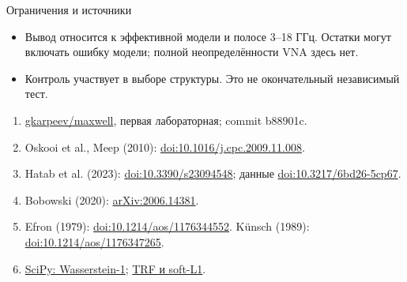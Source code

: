 \documentclass{beamer}
\begin{document}
\begin{frame}{Ограничения и источники}\footnotesize
\begin{itemize}
\item Вывод относится к эффективной модели и полосе 3--18 ГГц.
Остатки могут включать ошибку модели; полной неопределённости VNA здесь нет.
\item Контроль участвует в выборе структуры. Это не окончательный независимый тест.
\end{itemize}
\medskip
\begin{enumerate}
\item \href{https://github.com/gkarpeev/maxwell}{gkarpeev/maxwell}, первая лабораторная; commit b88901c.
\item Oskooi et al., Meep (2010): \href{https://doi.org/10.1016/j.cpc.2009.11.008}{doi:10.1016/j.cpc.2009.11.008}.
\item Hatab et al. (2023): \href{https://doi.org/10.3390/s23094548}{doi:10.3390/s23094548};
данные \href{https://doi.org/10.3217/6bd26-5cp67}{doi:10.3217/6bd26-5cp67}.
\item Bobowski (2020): \href{https://arxiv.org/abs/2006.14381}{arXiv:2006.14381}.
\item Efron (1979): \href{https://doi.org/10.1214/aos/1176344552}{doi:10.1214/aos/1176344552}.
Künsch (1989): \href{https://doi.org/10.1214/aos/1176347265}{doi:10.1214/aos/1176347265}.
\item \href{https://docs.scipy.org/doc/scipy/reference/generated/scipy.stats.wasserstein_distance.html}{SciPy: Wasserstein-1};
\href{https://docs.scipy.org/doc/scipy/reference/generated/scipy.optimize.least_squares.html}{TRF и soft-L1}.
\end{enumerate}
\end{frame}
\end{document}
